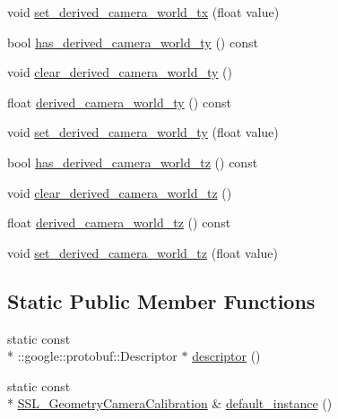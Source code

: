 \begin{DoxyCompactItemize}
\item 
void \hyperlink{class_s_s_l___geometry_camera_calibration_afaa0accb33a7274b1a619b98b669dc53}{set\-\_\-derived\-\_\-camera\-\_\-world\-\_\-tx} (float value)
\item 
bool \hyperlink{class_s_s_l___geometry_camera_calibration_af176feb6e5e9b844f5f95b32a1b85387}{has\-\_\-derived\-\_\-camera\-\_\-world\-\_\-ty} () const 
\item 
void \hyperlink{class_s_s_l___geometry_camera_calibration_a1dfe6bd248ddde5afa392ce6819b1a5a}{clear\-\_\-derived\-\_\-camera\-\_\-world\-\_\-ty} ()
\item 
float \hyperlink{class_s_s_l___geometry_camera_calibration_aaad5f7c1a9a8d5d08cfb3f0b7c488cec}{derived\-\_\-camera\-\_\-world\-\_\-ty} () const 
\item 
void \hyperlink{class_s_s_l___geometry_camera_calibration_ab7d3f5d1fabcfb4328afcdbdaa524b3a}{set\-\_\-derived\-\_\-camera\-\_\-world\-\_\-ty} (float value)
\item 
bool \hyperlink{class_s_s_l___geometry_camera_calibration_a41f860558caff969dd7ceb6c4a6fab03}{has\-\_\-derived\-\_\-camera\-\_\-world\-\_\-tz} () const 
\item 
void \hyperlink{class_s_s_l___geometry_camera_calibration_a614710268b9e7451d5cd605068038439}{clear\-\_\-derived\-\_\-camera\-\_\-world\-\_\-tz} ()
\item 
float \hyperlink{class_s_s_l___geometry_camera_calibration_ae49985e5e3da456cffd1bad0434a485b}{derived\-\_\-camera\-\_\-world\-\_\-tz} () const 
\item 
void \hyperlink{class_s_s_l___geometry_camera_calibration_ac68587c166705360619e4d83efe76bde}{set\-\_\-derived\-\_\-camera\-\_\-world\-\_\-tz} (float value)
\end{DoxyCompactItemize}
\subsection*{Static Public Member Functions}
\begin{DoxyCompactItemize}
\item 
static const \\*
\-::google\-::protobuf\-::\-Descriptor $\ast$ \hyperlink{class_s_s_l___geometry_camera_calibration_a0bb8514e7de23c3801f066f3010e9e70}{descriptor} ()
\item 
static const \\*
\hyperlink{class_s_s_l___geometry_camera_calibration}{S\-S\-L\-\_\-\-Geometry\-Camera\-Calibration} \& \hyperlink{class_s_s_l___geometry_camera_calibration_ad1d70fd8f509678adce78e0b36973cc8}{default\-\_\-instance} ()
\end{DoxyCompactItemize}
